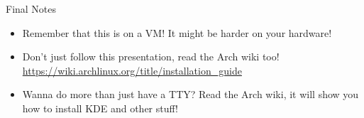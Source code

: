 \documentclass{beamer}
\begin{document}
\begin{frame}{Final Notes}
\begin{itemize}
    \item Remember that this is on a VM! It might be harder on your hardware! \pause
    \item Don't just follow this presentation, read the Arch wiki too! \url{https://wiki.archlinux.org/title/installation_guide} \pause
    \item Wanna do more than just have a TTY? Read the Arch wiki, it will show you how to install KDE and other stuff! \pause
\end{itemize}
\end{frame}

\begin{frame}
    \thankyouframe
\end{frame}
\end{document}
